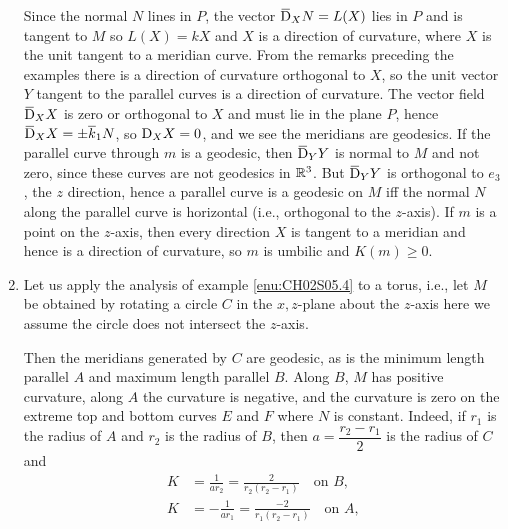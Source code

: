 \documentclass[../main]{subfiles}
\begin{document}
\begin{enumerate}
    Since the normal $N$ lines in $P$, the vector $\covariant_XN = L(X)$ lies in $P$ and is tangent to $M$ so $L(X) = kX$ and $X$ is a direction of curvature, where $X$ is the unit tangent to a meridian curve. From the remarks preceding the examples there is a direction of curvature orthogonal to $X$, so the unit vector $Y$ tangent to the parallel curves is a direction of curvature. The vector field $\covariant_XX$ is zero or orthogonal to $X$ and must lie in the plane $P$, hence $\covariant_XX = \pm\bar{k}_{1}N$, so $\mathrm{D}_XX = 0$, and we see the meridians are geodesics. If the parallel curve through $m$ is a geodesic, then $\covariant_YY$ is normal to $M$ and not zero, since these curves are not geodesics in $\mathbb{R}^3$. But $\covariant_YY$ is orthogonal to $e_3$, the $z$ direction, hence a parallel curve is a geodesic on $M$ iff the normal $N$ along the parallel curve is horizontal (i.e., orthogonal to the $z$-axis). If $m$ is a point on the $z$-axis, then every direction $X$ is tangent to a meridian and hence is a direction of curvature, so $m$ is umbilic and $K(m)\ge 0$.\label{enu:CH02S05.4}
    \item Let us apply the analysis of example \ref{enu:CH02S05.4} to a torus, i.e., let $M$ be obtained by rotating a circle $C$ in the $x, z$-plane about the $z$-axis here we assume the circle does not intersect the $z$-axis. 
    
    
    
    Then the meridians generated by $C$ are geodesic, as is the minimum length parallel $A$ and maximum length parallel $B$. Along $B$, $M$ has positive curvature, along $A$ the curvature is negative, and the curvature is zero on the extreme top and bottom curves $E$ and $F$ where $N$ is constant. Indeed, if $r_1$ is the radius of $A$ and $r_2$ is the radius of $B$, then $a = \dfrac{r_2-r_1}{2}$ is the radius of $C$ and 
    \[ 
    \begin{aligned}
        K &= \frac{1}{ar_2} = \frac{2}{r_2(r_2 - r_1)}\hspace{1em} \text{on } B, \\
        K &= -\frac{1}{ar_1} = \frac{-2}{r_1(r_2-r_1)}\hspace{1em} \text{on } A,
    \end{aligned} 
    \]
    

\end{enumerate}
\end{document}
